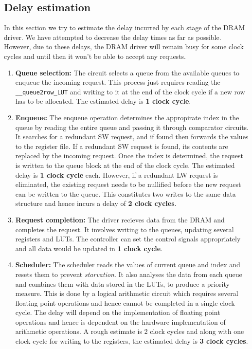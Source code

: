 \documentclass[hidelinks,12pt]{article}
\begin{document}
\subsection{Delay estimation}
In this section we try to estimate the delay incurred by each stage of the DRAM driver. We have attempted to decrease the delay times as far as possible.
However, due to these delays, the DRAM driver will remain busy for some clock cycles and until then it won't be able to accept any requests.

\begin{enumerate}
    \item \textbf{Queue selection:} The circuit selects a queue from the available queues to enqueue the incoming request.
          This process just requires reading the \verb|__queue2row_LUT| and writing to it at the end of the clock cycle if a new row has to be allocated. The estimated delay is \textbf{1 clock cycle}.
    \item \textbf{Enqueue:} The enqueue operation determines the appropirate index in the queue by reading the entire queue and passing it through comparator circuits.
          It searches for a redundant SW request, and if found then forwards the values to the register file. If a redundant SW request is found, its contents are replaced by the incoming request.
          Once the index is determined, the request is written to the queue block at the end of the clock cycle. The estimated delay is \textbf{1 clock cycle} each.
          However, if a redundant LW request is eliminated, the existing request needs to be nullified before the new request can be written to the queue.
          This constitutes two writes to the same data structure and hence incurs a delay of \textbf{2 clock cycles}.
    \item \textbf{Request completion:} The driver recieves data from the DRAM and completes the request. It involves writing to the queues, updating several registers and LUTs.
          The controller can set the control signals appropriately and all data would be updated in \textbf{1 clock cycle}.
    \item \textbf{Scheduler:} The scheduler reads the values of current queue and index and resets them to prevent \textit{starvation}.
          It also analyses the data from each queue and combines them with data stored in the LUTs, to produce a priority measure. This is done by a logical arithmetic circuit which requires several floating point operations and hence cannot be completed in a single clock cycle.
          The delay will depend on the implementation of floating point operations and hence is dependent on the hardware implementation of arithmetic operations.
          A rough estimate is 2 clock cycles and along with one clock cycle for writing to the registers, the estimated delay is \textbf{3 clock cycles}.
\end{enumerate}
\end{document}
